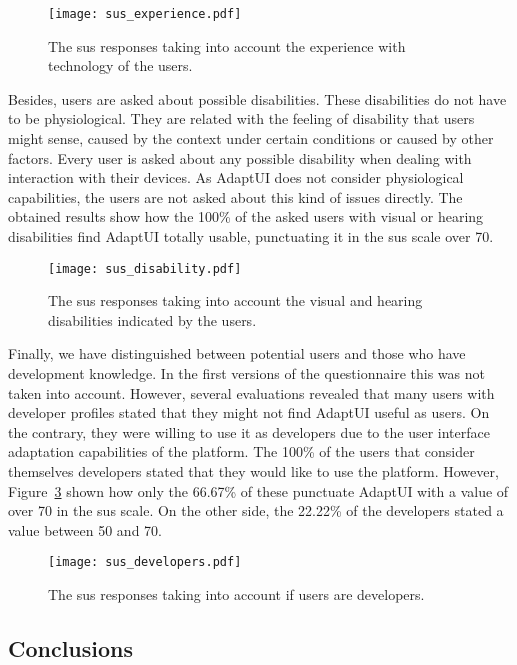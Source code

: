 \begin{figure}
\centering
\texttt{[image: sus\_experience.pdf]}
\caption{The \ac{sus} responses taking into account the experience with technology
of the users.}
\label{fig:sus_experience}
\end{figure}

Besides, users are asked about possible disabilities. These disabilities do not
have to be physiological. They are related with the feeling of disability that
users might sense, caused by the context under certain conditions or caused by
other factors. Every user is asked about any possible disability when dealing
with interaction with their devices. As AdaptUI does not consider physiological
capabilities, the users are not asked about this kind of issues directly. The
obtained results show how the 100\% of the asked users with visual or hearing
disabilities find AdaptUI totally usable, punctuating it in the \ac{sus} scale over
70.

\begin{figure}
\centering
\texttt{[image: sus\_disability.pdf]}
\caption{The \ac{sus} responses taking into account the visual and hearing 
disabilities
indicated by the users.}
\label{fig:sus_disability}
\end{figure}

Finally, we have distinguished between potential users and those who have
development knowledge. In the first versions of the questionnaire this was not
taken into account. However, several evaluations revealed that many users with 
developer profiles stated that they might not find AdaptUI useful as users. On
the contrary, they were willing to use it as developers due to the user 
interface adaptation capabilities of the platform. The 100\% of the users that 
consider themselves developers stated that they would like to use the platform. 
However, Figure~\ref{fig:sus_developers} shown how only the 66.67\% of these 
punctuate AdaptUI with a value of over 70 in the \ac{sus} scale. On the other side, 
the 22.22\% of the developers stated a value between 50 and 70.

\begin{figure}
\centering
\texttt{[image: sus\_developers.pdf]}
\caption{The \ac{sus} responses taking into account if users are developers.}
\label{fig:sus_developers}
\end{figure}

\subsection{Conclusions}
\label{sec:user_evaluation_conclusions}

